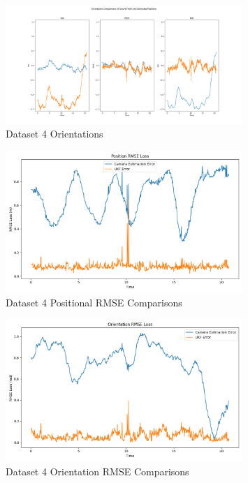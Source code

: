 \documentclass{article}
\begin{document}
\begin{figure}[H]
    \centering
    \includegraphics[width=0.8\textwidth]{./imgs/task4/studentdata4_ukf_orientations.png}
    \caption{Dataset 4 Orientations}
\end{figure}

\begin{figure}[H]
    \centering
    \includegraphics[width=0.8\textwidth]{./imgs/task4/studentdata4_ukf_position_rmse.png}
    \caption{Dataset 4 Positional RMSE Comparisons}
\end{figure}

\begin{figure}[H]
    \centering
    \includegraphics[width=0.8\textwidth]{./imgs/task4/studentdata4_ukf_orientation_rmse.png}
    \caption{Dataset 4 Orientation RMSE Comparisons}
\end{figure}
\end{document}
